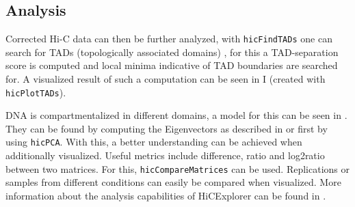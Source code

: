 




\subsection{Analysis}\label{sec:analysis}



Corrected Hi-C data can then be further analyzed, with \verb|hicFindTADs| one
can search for TADs (topologically associated domains) \cite{ramirez2018high},
for this a TAD-separation score is computed and local minima indicative of TAD
boundaries are searched for. A visualized result of such a computation can be
seen in I (created with \verb|hicPlotTADs|).

DNA is compartmentalized \cite{lieberman2009comprehensive} in different
domains, a model for this can be seen in . They
can be found by computing the Eigenvectors as described in
\cite{lieberman2009comprehensive} or \cite{imakaev2012iterative} first by using
\verb|hicPCA|. With this, a better understanding can be achieved when
additionally visualized. Useful metrics include difference, ratio and log2ratio
between two matrices. For this, \verb|hicCompareMatrices| can be used.
Replications or samples from different conditions can easily be compared when
visualized. More information about the analysis capabilities of HiCExplorer can
be found in \cite{wolff2018galaxy}.

